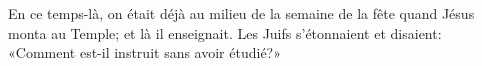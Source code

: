 En ce temps-là, on était déjà au milieu de la semaine de la fête
	quand Jésus monta au Temple; et là il enseignait.
Les Juifs s’étonnaient et disaient:
	«Comment est-il instruit sans avoir étudié?»

